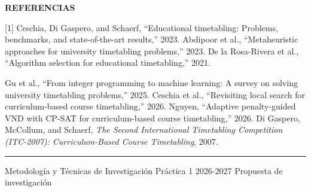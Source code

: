 \documentclass[10pt]{article}
\newcommand{\proposalheading}[1]{%
  \vspace{1.8mm}%
  {\color{wine}\sffamily\fontsize{9.8}{11.2}\selectfont\bfseries
  \MakeUppercase{#1}}\par
  \vspace{0.55mm}%
}
\begin{document}
\begin{minipage}[t][0.98\textheight][t]{\textwidth}
\proposalheading{Referencias}
{\fontsize{7.2}{8.3}\selectfont\raggedright
[1] Ceschia, Di Gaspero, and Schaerf, ``Educational timetabling: Problems, benchmarks, and state-of-the-art results,'' 2023. \quad
[2] Abdipoor et al., ``Metaheuristic approaches for university timetabling problems,'' 2023. \quad
[3] De la Rosa-Rivera et al., ``Algorithm selection for educational timetabling,'' 2021.\par
[4] Gu et al., ``From integer programming to machine learning: A survey on solving university timetabling problems,'' 2025. \quad
[5] Ceschia et al., ``Revisiting local search for curriculum-based course timetabling,'' 2026. \quad
[6] Nguyen, ``Adaptive penalty-guided VND with CP-SAT for curriculum-based course timetabling,'' 2026. \quad
[7] Di Gaspero, McCollum, and Schaerf, \textit{The Second International Timetabling Competition (ITC-2007): Curriculum-Based Course Timetabling}, 2007.}

\vfill
{\color{rulegray}\rule{\linewidth}{0.55pt}}\vspace{0.6mm}
{\color{muted}\sffamily\fontsize{7.1}{8.2}\selectfont
Metodología y Técnicas de Investigación \textbar{} Práctica 1 \textbar{} 2026-2027
\hfill Propuesta de investigación}

\end{minipage}
\end{document}
